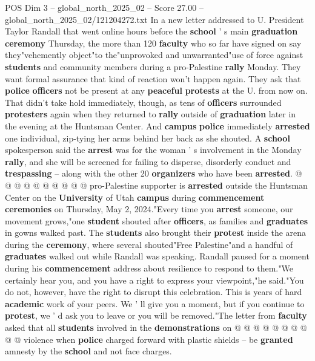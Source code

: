 \begin{textsample}{POS Dim 3 – global\_north\_2025\_02 – Score 27.00 – global\_north\_2025\_02/121204272.txt}  \label{ex:f3_pos_288}
In a new letter addressed to U.
President Taylor Randall that went online hours before the \textbf{school} ' s main \textbf{graduation} \textbf{ceremony} Thursday, the more than 120 \textbf{faculty} who so far have signed on say they"vehemently object"to the"unprovoked and unwarranted"use of force against \textbf{students} and community members during a pro-Palestine \textbf{rally} Monday.
They want formal assurance that kind of reaction won't happen again.
They ask that \textbf{police} \textbf{officers} not be present at any \textbf{peaceful} \textbf{protests} at the U. from now on.
That didn't take hold immediately, though, as tens of \textbf{officers} surrounded \textbf{protesters} again when they returned to \textbf{rally} outside of \textbf{graduation} later in the evening at the Huntsman Center.
And \textbf{campus} \textbf{police} immediately \textbf{arrested} one individual, zip-tying her arms behind her back as she shouted.
A \textbf{school} spokesperson said the \textbf{arrest} was for the woman ' s involvement in the Monday \textbf{rally}, and she will be screened for failing to disperse, disorderly conduct and \textbf{trespassing} -- along with the other 20 \textbf{organizers} who have been \textbf{arrested}. @ @ @ @ @ @ @ @ @ @ pro-Palestine supporter is \textbf{arrested} outside the Huntsman Center on the \textbf{University} of Utah \textbf{campus} during \textbf{commencement} \textbf{ceremonies} on Thursday, May 2, 2024."Every time you \textbf{arrest} someone, our movement grows,"one \textbf{student} shouted after \textbf{officers}, as families and \textbf{graduates} in gowns walked past.
The \textbf{students} also brought their \textbf{protest} inside the arena during the \textbf{ceremony}, where several shouted"Free Palestine"and a handful of \textbf{graduates} walked out while Randall was speaking.
Randall paused for a moment during his \textbf{commencement} address about resilience to respond to them."We certainly hear you, and you have a right to express your viewpoint,"he said."You do not, however, have the right to disrupt this celebration.
This is years of hard \textbf{academic} work of your peers.
We ' ll give you a moment, but if you continue to \textbf{protest}, we ' d ask you to leave or you will be removed."The letter from \textbf{faculty} asked that all \textbf{students} involved in the \textbf{demonstrations} on @ @ @ @ @ @ @ @ @ @ violence when \textbf{police} charged forward with plastic shields -- be \textbf{granted} amnesty by the \textbf{school} and not face charges.

\end{textsample}
